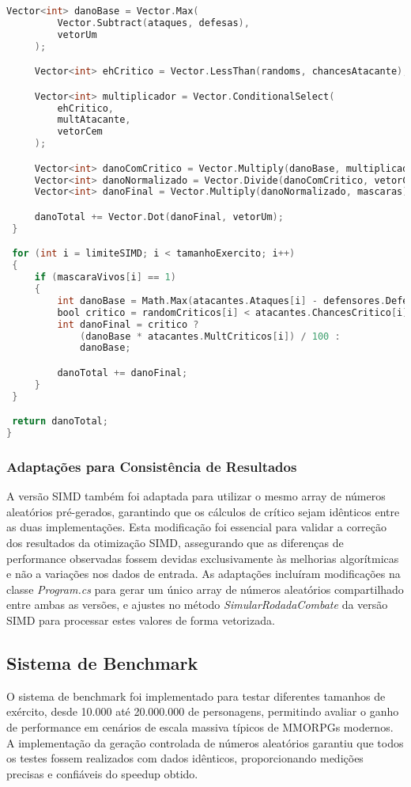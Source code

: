 \documentclass[
	12pt,				%
	oneside,			%
	a4paper,			%
	english,			%
	brazil,				%
	]{abntex2}
\begin{document}
{\begin{lstlisting}[language=C]
     Vector<int> danoBase = Vector.Max(
         Vector.Subtract(ataques, defesas),
         vetorUm
     );

     Vector<int> ehCritico = Vector.LessThan(randoms, chancesAtacante);

     Vector<int> multiplicador = Vector.ConditionalSelect(
         ehCritico,
         multAtacante,
         vetorCem
     );

     Vector<int> danoComCritico = Vector.Multiply(danoBase, multiplicador);
     Vector<int> danoNormalizado = Vector.Divide(danoComCritico, vetorCem);
     Vector<int> danoFinal = Vector.Multiply(danoNormalizado, mascaras);

     danoTotal += Vector.Dot(danoFinal, vetorUm);
 }

 for (int i = limiteSIMD; i < tamanhoExercito; i++)
 {
     if (mascaraVivos[i] == 1)
     {
         int danoBase = Math.Max(atacantes.Ataques[i] - defensores.Defesas[i], 1);
         bool critico = randomCriticos[i] < atacantes.ChancesCritico[i];
         int danoFinal = critico ?
             (danoBase * atacantes.MultCriticos[i]) / 100 :
             danoBase;

         danoTotal += danoFinal;
     }
 }

 return danoTotal;
}

\end{lstlisting}
\subsubsection{Adaptações para Consistência de Resultados}
A versão SIMD também foi adaptada para utilizar o mesmo array de números aleatórios pré-gerados, garantindo que os cálculos de crítico sejam idênticos entre as duas implementações. Esta modificação foi essencial para validar a correção dos resultados da otimização SIMD, assegurando que as diferenças de performance observadas fossem devidas exclusivamente às melhorias algorítmicas e não a variações nos dados de entrada.
As adaptações incluíram modificações na classe \textit{Program.cs} para gerar um único array de números aleatórios compartilhado entre ambas as versões, e ajustes no método \textit{SimularRodadaCombate} da versão SIMD para processar estes valores de forma vetorizada.
\subsection{Sistema de Benchmark}
O sistema de benchmark foi implementado para testar diferentes tamanhos de exército, desde 10.000 até 20.000.000 de personagens, permitindo avaliar o ganho de performance em cenários de escala massiva típicos de MMORPGs modernos. A implementação da geração controlada de números aleatórios garantiu que todos os testes fossem realizados com dados idênticos, proporcionando medições precisas e confiáveis do speedup obtido.

}
\end{document}
